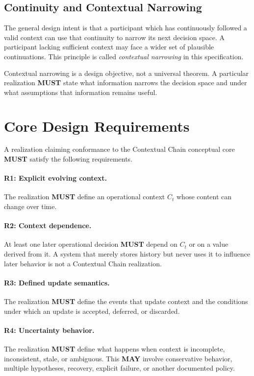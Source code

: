 \documentclass[11pt]{article}
\begin{document}
\subsection{Continuity and Contextual Narrowing}
The general design intent is that a participant which has continuously followed a valid context
can use that continuity to narrow its next decision space. A participant lacking sufficient context
may face a wider set of plausible continuations. This principle is called \emph{contextual narrowing}
in this specification.

Contextual narrowing is a design objective, not a universal theorem. A particular realization
\textbf{MUST} state what information narrows the decision space and under what assumptions that
information remains useful.

\section{Core Design Requirements}
A realization claiming conformance to the Contextual Chain conceptual core \textbf{MUST} satisfy
the following requirements.

\paragraph{R1: Explicit evolving context.}
The realization \textbf{MUST} define an operational context $C_t$ whose content can change over time.

\paragraph{R2: Context dependence.}
At least one later operational decision \textbf{MUST} depend on $C_t$ or on a value derived from it.
A system that merely stores history but never uses it to influence later behavior is not a
Contextual Chain realization.

\paragraph{R3: Defined update semantics.}
The realization \textbf{MUST} define the events that update context and the conditions under which
an update is accepted, deferred, or discarded.

\paragraph{R4: Uncertainty behavior.}
The realization \textbf{MUST} define what happens when context is incomplete, inconsistent, stale,
or ambiguous. This \textbf{MAY} involve conservative behavior, multiple hypotheses, recovery,
explicit failure, or another documented policy.
\end{document}
